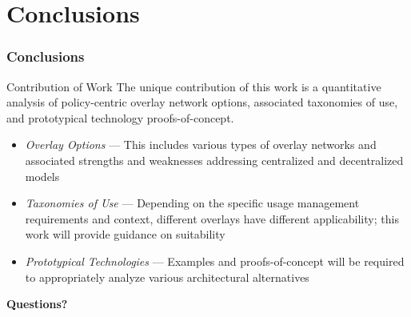 \section{Conclusions}
\begin{frame}
\frametitle{Conclusions}
\begin{beamerboxesrounded}[shadow]{Contribution of Work}
The unique contribution of this work is a quantitative analysis of policy-centric overlay network options, associated taxonomies of use, and prototypical technology proofs-of-concept.
\end{beamerboxesrounded}
\begin{itemize}
\item \textit{Overlay Options} --- This includes various types of overlay networks and associated strengths and weaknesses addressing centralized and decentralized models
\item \textit{Taxonomies of Use} --- Depending on the specific usage management requirements and context, different overlays have different applicability; this work will provide guidance on suitability
\item \textit{Prototypical Technologies} --- Examples and proofs-of-concept will be required to appropriately analyze various architectural alternatives
\end{itemize}
\end{frame}

\begin{frame}[c]
\begin{center}
\textbf{Questions?}
\end{center}
\end{frame}